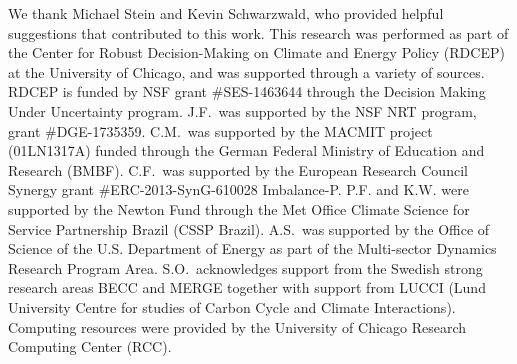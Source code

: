 \documentclass[esd, final]{copernicus} %
\begin{document}
\begin{acknowledgements}
We thank Michael Stein and Kevin Schwarzwald, who provided helpful suggestions that contributed to this work. This research was performed as part of the Center for Robust Decision-Making on Climate and Energy Policy (RDCEP) at the University of Chicago, and was supported through a variety of sources. RDCEP is funded by NSF grant \#SES-1463644 through the Decision Making Under Uncertainty program. J.F.\ was supported by the NSF NRT program, grant \#DGE-1735359. C.M.\ was supported by the MACMIT project (01LN1317A) funded through the German Federal Ministry of Education and Research (BMBF).  C.F.\ was supported by the European Research Council Synergy grant \#ERC-2013-SynG-610028 Imbalance-P. P.F. and K.W. were supported  by the Newton Fund through the Met Office Climate Science for Service Partnership Brazil (CSSP Brazil). A.S.\ was supported by the Office of Science of the U.S. Department of Energy as part of the Multi-sector Dynamics Research Program Area. S.O.\ acknowledges support from the Swedish strong research areas BECC and MERGE together with support from LUCCI (Lund University Centre for studies of Carbon Cycle and Climate Interactions). Computing resources were provided by the University of Chicago Research Computing Center (RCC).
\end{acknowledgements}



\end{document}
